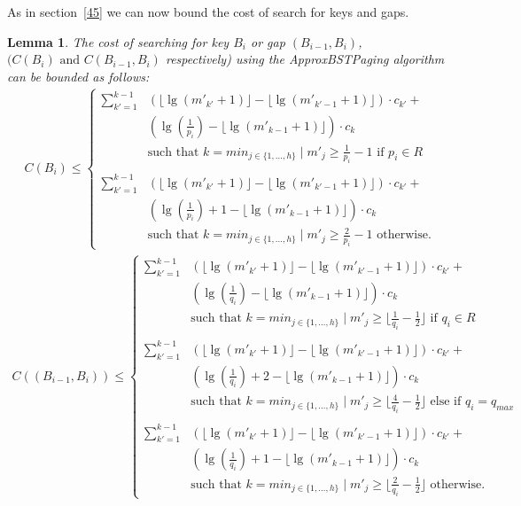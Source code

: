 \documentclass[letterpaper,12pt,titlepage,oneside,final]{book}
\theoremstyle{plain}
\newtheorem{lem}[thm]{Lemma}
\begin{document}
As in section~\ref{45} we can now bound the cost of search for keys and gaps.

\begin{lem} \label{ABSTExactLem}
The cost of searching for key $B_i$ or gap $(B_{i-1},B_i)$, $(C(B_i) \text{ and } C(B_{i-1},B_i)$ respectively) using the \textit{ApproxBSTPaging} algorithm can be bounded as follows: 
\begin{align*} 
C(B_i) \leq 
\begin{cases}
 \sum_{k'=1}^{k-1} &\left(\lfloor \lg(m'_{k'}+1) \rfloor - \lfloor \lg(m'_{k'-1}+1) \rfloor \right)\cdot c_{k'}+ \\
 &\left(\lg(\frac{1}{p_i}) - \lfloor \lg(m'_{k-1}+1) \rfloor \right)\cdot c_k\\
&\text{such that } k=min_{j \in \{1, ..., h\}} \mid m'_j \geq \frac{1}{p_i}-1 \text{ if } p_i \in R \\\\
 \sum_{k'=1}^{k-1} &\left(\lfloor \lg(m'_{k'}+1) \rfloor - \lfloor \lg(m'_{k'-1}+1) \rfloor \right)\cdot c_{k'}+ \\
 &\left(\lg(\frac{1}{p_i}) + 1 - \lfloor \lg(m'_{k-1}+1) \rfloor \right)\cdot c_k\\
&\text{such that } k=min_{j \in \{1, ..., h\}} \mid m'_j \geq \frac{2}{p_i}-1 \text{ otherwise.}  
\end{cases}
\end{align*}
\begin{align*}
C((B_{i-1},B_i)) \leq
\begin{cases}
 \sum_{k'=1}^{k-1} &\left(\lfloor \lg(m'_{k'}+1) \rfloor - \lfloor \lg(m'_{k'-1}+1) \rfloor \right)\cdot c_{k'}+ \\
 &\left(\lg(\frac{1}{q_i}) - \lfloor \lg(m'_{k-1}+1) \rfloor \right)\cdot c_k\\
&\text{such that } k=min_{j \in \{1, ..., h\}} \mid m'_j \geq \lfloor \frac{1}{q_i}-\frac{1}{2} \rfloor \text{ if } q_i \in R  \\\\
  \sum_{k'=1}^{k-1} &\left(\lfloor \lg(m'_{k'}+1) \rfloor - \lfloor \lg(m'_{k'-1}+1) \rfloor \right)\cdot c_{k'}+ \\
 &\left(\lg(\frac{1}{q_i}) + 2 - \lfloor \lg(m'_{k-1}+1) \rfloor \right)\cdot c_k\\
&\text{such that } k=min_{j \in \{1, ..., h\}} \mid m'_j \geq \lfloor \frac{4}{q_i}-\frac{1}{2} \rfloor \text{ else if } q_i = q_{max}  \\\\
 \sum_{k'=1}^{k-1} &\left(\lfloor \lg(m'_{k'}+1) \rfloor - \lfloor \lg(m'_{k'-1}+1) \rfloor \right)\cdot c_{k'}+ \\
 &\left(\lg(\frac{1}{q_i})+1 - \lfloor \lg(m'_{k-1}+1) \rfloor \right)\cdot c_k\\
&\text{such that } k=min_{j \in \{1, ..., h\}} \mid m'_j \geq \lfloor \frac{2}{q_i}-\frac{1}{2} \rfloor \text{ otherwise.}
\end{cases}
\end{align*}
\end{lem}
\end{document}
